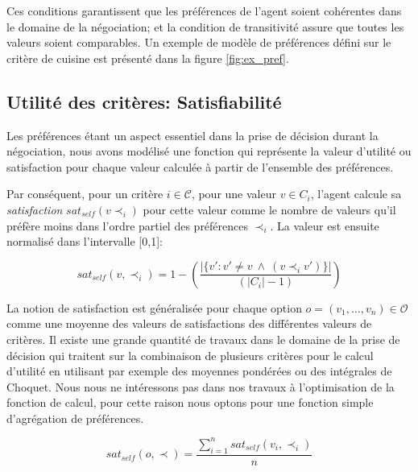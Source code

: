 			 Ces conditions garantissent que les préférences de l'agent soient cohérentes dans le domaine de la négociation; et la condition de transitivité assure que toutes les valeurs soient comparables. Un exemple de modèle de préférences défini sur le critère de cuisine est présenté dans la figure \ref{fig:ex_pref}.
			
			\subsection{Utilité des critères: Satisfiabilité}
			
			Les préférences étant un aspect essentiel dans la prise de décision durant la négociation, nous avons modélisé une fonction qui représente la valeur d'utilité ou satisfaction pour chaque valeur calculée à partir de l'ensemble des préférences. 
			
			Par conséquent, pour un critère $i\in \mathcal{C}$, pour une valeur $v\in C_i$, l'agent calcule sa \emph{satisfaction} $sat_{self}(v \prec_i)$ pour cette valeur comme le nombre de valeurs qu'il préfère moins dans l'ordre partiel des préférences $\prec_i$. La valeur est ensuite normalisé dans l'intervalle [0,1]:
			
			\begin{equation}
			sat_{self}(v, \prec_i) =	1 - \left( \frac{|\{v' : v' \neq v \  \wedge \ (v \prec_i v')\}| }{( |C_i| - 1 )}\right)
			\end{equation}
			
			La notion de satisfaction est généralisée pour chaque option $ o= (v_1, \ldots, v_n) \in \mathcal{O}$ comme une moyenne des valeurs de satisfactions des différentes valeurs de critères. Il existe une grande quantité de travaux  dans le domaine de la prise de décision  qui traitent sur la combinaison de plusieurs critères pour le calcul d'utilité en utilisant par exemple des moyennes pondérées ou des intégrales de Choquet. Nous nous ne intéressons pas dans nos travaux à l'optimisation de la fonction de calcul, pour cette raison nous optons pour une fonction simple d'agrégation de préférences.
	
			\begin{equation}
			sat_{self}(o, \prec) = \frac{\sum_{i=1}^{n} sat_{self}(v_i, \prec_i) }{n}
			\end{equation}
		
